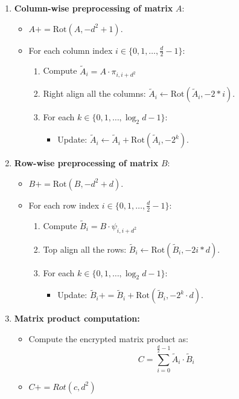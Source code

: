 \documentclass[article]{iacrtrans}
\begin{document}
\begin{enumerate}
    \item \textbf{Column-wise preprocessing of matrix } $A$: 
    \begin{itemize}
        \item $A +=  \mathrm{Rot}(A, -d^2+1)$.
        \item For each column index $i \in \{0, 1, \dots, \frac{d}{2}-1\}$:
        \begin{enumerate}
            \item Compute $\tilde{A}_i = A \cdot \pi_{i, i+d^2}$
            \item Right align all the columns: $\tilde{A}_i \gets \mathrm{Rot}(\tilde{A}_i, -2*i)$.
            \item For each $k \in \{0, 1, \dots,  \log_2 d  - 1\}$:
            \begin{itemize}
                \item Update: $\tilde{A}_i \gets \tilde{A}_i + \mathrm{Rot}(\tilde{A}_i, -2^k)$.
            \end{itemize}
        \end{enumerate}
    \end{itemize}

    \item \textbf{Row-wise preprocessing of matrix } $B$: 
    \begin{itemize}
        \item $B +=  \mathrm{Rot}(B, -d^2+d)$.
        \item For each row index $i \in \{0, 1, \dots, \frac{d}{2}-1\}$:
        \begin{enumerate}
            \item Compute $\tilde{B}_i = B \cdot \psi_{i, i + d^2}$
            \item Top align all the rows: $\tilde{B}_i \gets \mathrm{Rot}(\tilde{B}_i, -2i*d)$.
            \item For each $k \in \{0, 1, \dots, \log_2 d - 1\}$:
            \begin{itemize}
                \item Update: $\tilde{B}_i  += \tilde{B}_i + \mathrm{Rot}(\tilde{B}_i, -2^k \cdot d)$.
            \end{itemize}
        \end{enumerate}
    \end{itemize}

    \item \textbf{Matrix product computation:}
    \begin{itemize}
        \item Compute the encrypted matrix product as:
        \[
            C = \sum_{i=0}^{\frac{d}{2}-1} \tilde{A}_i \cdot \tilde{B}_i
        \]
        \item $C += Rot(c, d^2)$
    \end{itemize}
\end{enumerate}
\end{document}
